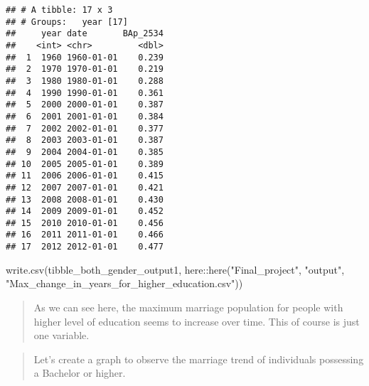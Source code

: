 \documentclass[
]{article}
\newenvironment{Shaded}{\begin{snugshade}}{\end{snugshade}}
\newcommand{\FunctionTok}[1]{\textcolor[rgb]{0.00,0.00,0.00}{#1}}
\newcommand{\NormalTok}[1]{#1}
\newcommand{\SpecialCharTok}[1]{\textcolor[rgb]{0.00,0.00,0.00}{#1}}
\newcommand{\StringTok}[1]{\textcolor[rgb]{0.31,0.60,0.02}{#1}}
\begin{document}
\begin{verbatim}
## # A tibble: 17 x 3
## # Groups:   year [17]
##     year date       BAp_2534
##    <int> <chr>         <dbl>
##  1  1960 1960-01-01    0.239
##  2  1970 1970-01-01    0.219
##  3  1980 1980-01-01    0.288
##  4  1990 1990-01-01    0.361
##  5  2000 2000-01-01    0.387
##  6  2001 2001-01-01    0.384
##  7  2002 2002-01-01    0.377
##  8  2003 2003-01-01    0.387
##  9  2004 2004-01-01    0.385
## 10  2005 2005-01-01    0.389
## 11  2006 2006-01-01    0.415
## 12  2007 2007-01-01    0.421
## 13  2008 2008-01-01    0.430
## 14  2009 2009-01-01    0.452
## 15  2010 2010-01-01    0.456
## 16  2011 2011-01-01    0.466
## 17  2012 2012-01-01    0.477
\end{verbatim}

\begin{Shaded}
\begin{Highlighting}[]
\FunctionTok{write.csv}\NormalTok{(tibble\_both\_gender\_output1,}
\NormalTok{          here}\SpecialCharTok{::}\FunctionTok{here}\NormalTok{(}\StringTok{"Final\_project"}\NormalTok{, }\StringTok{"output"}\NormalTok{, }\StringTok{"Max\_change\_in\_years\_for\_higher\_education.csv"}\NormalTok{))}
\end{Highlighting}
\end{Shaded}

\begin{quote}
As we can see here, the maximum marriage population for people with
higher level of education seems to increase over time. This of course is
just one variable.
\end{quote}

\begin{quote}
Let's create a graph to observe the marriage trend of individuals
possessing a Bachelor or higher.
\end{quote}
\end{document}
